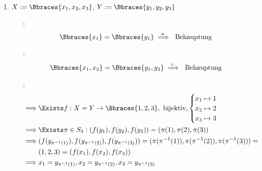 \begin{solution}
\begin{enumerate}[label = \alph*.]
    \item $X := \Bbraces{x_1, x_2, x_3}$, $Y := \Bbraces{y_1, y_2, y_3}$

    \begin{itemize}

        \item
        [\Quote{$|X| = 1$}:]
        \begin{align*}
            \Bbraces{x_1} = \Bbraces{y_1}
            \stackrel{\text{a.}}{\implies}
            ~\text{Behauptung}
        \end{align*}

        \item
        [\Quote{$|X| = 2$}:]
        \begin{align*}
            \Bbraces{x_1, x_2} = \Bbraces{y_1, y_2}
            \stackrel{\text{c.}}{\implies}
            ~\text{Behauptung}
        \end{align*}

        \item
        [\Quote{$|X| = 3$}:]
        \begin{align*}
            \implies
            & \Exists f:
            X = Y \to \Bbraces{1, 2, 3},
            ~\text{bijektiv},
            \begin{cases}
                x_1 \mapsto 1 \\
                x_2 \mapsto 2 \\
                x_3 \mapsto 3
            \end{cases} \\
            \implies
            & \Exists \pi \in S_3: (f(y_1), f(y_2), f(y_3)) = (\pi(1), \pi(2), \pi(3)) \\
            \implies
            & (f(y_{\pi^{-1}(1)}), f(y_{\pi^{-1}(2)}), f(y_{\pi^{-1}(3)})) = (\pi(\pi^{-1}(1)), \pi(\pi^{-1}(2)), \pi(\pi^{-1}(3))) = \\
            & (1, 2, 3) = (f(x_1), f(x_2), f(x_3)) \\
            \implies
            & x_1 = y_{\pi^{-1}(1)}, x_2 = y_{\pi^{-1}(2)}, x_3 = y_{\pi^{-1}(3)}
        \end{align*}

    \end{itemize}
\end{enumerate}

\end{solution}

